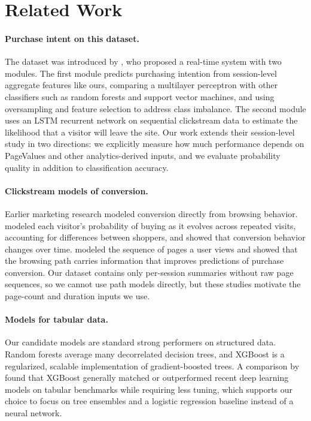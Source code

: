 \documentclass[11pt]{article}
\begin{document}
\section{Related Work}

\paragraph{Purchase intent on this dataset.}
The dataset was introduced by \citet{sakar2019realtime}, who proposed a
real-time system with two modules. The first module predicts purchasing
intention from session-level aggregate features like ours, comparing a
multilayer perceptron with other classifiers such as random forests and
support vector machines, and using oversampling and feature selection to
address class imbalance. The second module uses an LSTM recurrent network on
sequential clickstream data to estimate the likelihood that a visitor will
leave the site. Our work extends their session-level study in two directions:
we explicitly measure how much performance depends on PageValues and other
analytics-derived inputs, and we evaluate probability quality in addition to
classification accuracy.

\paragraph{Clickstream models of conversion.}
Earlier marketing research modeled conversion directly from browsing
behavior. \citet{moe2004dynamic} modeled each visitor's probability of
buying as it evolves across repeated visits, accounting for differences
between shoppers, and showed that conversion behavior changes over time.
\citet{montgomery2004clickstream} modeled the sequence of pages a user views
and showed that the browsing path carries information that improves
predictions of purchase conversion. Our dataset contains only per-session
summaries without raw page sequences, so we cannot use path models directly,
but these studies motivate the page-count and duration inputs we use.

\paragraph{Models for tabular data.}
Our candidate models are standard strong performers on structured data.
Random forests \citep{breiman2001random} average many decorrelated decision
trees, and XGBoost \citep{chen2016xgboost} is a regularized,
scalable implementation of gradient-boosted trees. A comparison by
\citet{shwartzziv2022tabular} found that XGBoost generally matched or
outperformed recent deep learning models on tabular benchmarks while
requiring less tuning, which supports our choice to focus on tree ensembles and a
logistic regression baseline instead of a neural network.
\end{document}
